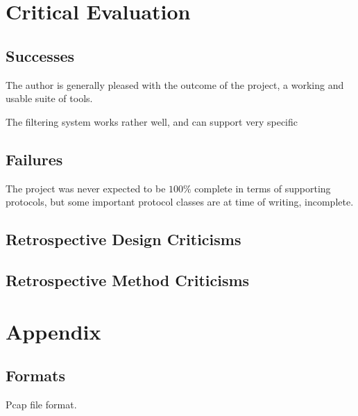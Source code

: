 \documentclass[10pt,a4paper,notitlepage,twoside]{report}
\begin{document}
\chapter{Critical Evaluation}
\label{sec:criteval}
\section{Successes}
The author is generally pleased with the outcome of the project, a working and usable suite of tools.

The filtering system works rather well, and can support very specific 
\section{Failures}
The project was never expected to be $100\%$ complete in terms of supporting protocols, but some important protocol classes are at time of writing, incomplete.

\section{Retrospective Design Criticisms}

\section{Retrospective Method Criticisms}


\chapter{Appendix}
\section{Formats}
Pcap file format.


\end{document}
